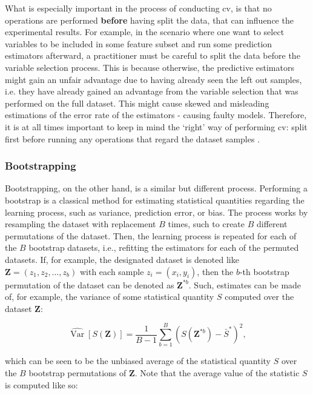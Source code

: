 \documentclass[../main.tex]{subfiles}
\begin{document}
What is especially important in the process of conducting \gls{cv}, is that no operations are performed \textbf{before} having split the data, that can influence the experimental results. For example, in the scenario where one want to select variables to be included in some feature subset and run some prediction estimators afterward, a practitioner must be careful to split the data before the variable selection process. This is because otherwise, the predictive estimators might gain an unfair advantage due to having already seen the left out samples, i.e. they have already gained an advantage from the variable selection that was performed on the full dataset. This might cause skewed and misleading estimations of the error rate of the estimators - causing faulty models. Therefore, it is at all times important to keep in mind the `right' way of performing \gls{cv}: split first before running any operations that regard the dataset samples \citep{ambroise_selection_2002}.




\subsubsection{Bootstrapping}\label{section:bootstrapping}
Bootstrapping, on the other hand, is a similar but different process. Performing a bootstrap is a classical method for estimating statistical quantities regarding the learning process, such as variance, prediction error, or bias. The process works by resampling the dataset with replacement $B$ times, such to create $B$ different permutations of the dataset. Then, the learning process is repeated for each of the $B$ bootstrap datasets, i.e., refitting the estimators for each of the permuted datasets. If, for example, the designated dataset is denoted like $\mathbf{Z}=\left(z_{1}, z_{2}, \ldots, z_{b}\right)$ with each sample $z_{i}=\left(x_{i}, y_{i}\right)$, then the $b$-th bootstrap permutation of the dataset can be denoted as $\mathbf{Z}^{* b}$. Such, estimates can be made of, for example, the variance of some statistical quantity $S$ computed over the dataset $\mathbf{Z}$:

\begin{equation}\label{eq:variance-bootstrap}
\widehat{\operatorname{Var}}[S(\mathbf{Z})]=\frac{1}{B-1} \sum_{b=1}^{B}\left(S\left(\mathbf{Z}^{* b}\right)-\bar{S}^{*}\right)^{2},
\end{equation}

which can be seen to be the unbiased average of the statistical quantity $S$ over the $B$ bootstrap permutations of $\mathbf{Z}$. Note that the average value of the statistic $S$ is computed like so:
\end{document}
